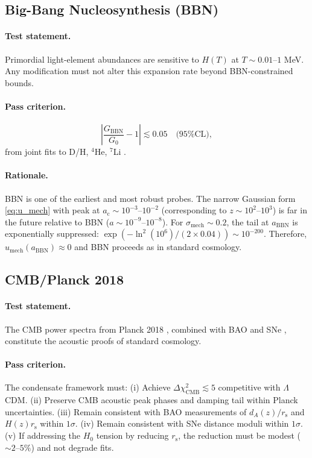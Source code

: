 \documentclass[11pt,a4paper]{article}
\newcommand{\ac}{a_{\mathrm{c}}}
\newcommand{\rs}{r_{\mathrm{s}}}
\newcommand{\sigmamech}{\sigma_{\mathrm{mech}}}
\newcommand{\umech}{u_{\mathrm{mech}}}
\theoremstyle{definition}
\begin{document}
\subsection{Big-Bang Nucleosynthesis (BBN)}
\label{sec:BBN}

\paragraph{Test statement.}
Primordial light-element abundances are sensitive to $H(T)$ at $T \sim 0.01$--$1$ MeV. Any modification must not alter this expansion rate beyond BBN-constrained bounds.

\paragraph{Pass criterion.}
\begin{equation}
\label{eq:BBN_G_bound}
\left| \frac{G_{\mathrm{BBN}}}{G_0} - 1 \right| \lesssim 0.05 \quad \text{(95\% CL)},
\end{equation}
from joint fits to D/H, $^4$He, $^7$Li \cite{BBN_Gbounds,PDG_BBN,Cooke_D2014,AdesOlivares_He2020}.

\paragraph{Rationale.}
BBN is one of the earliest and most robust probes. The narrow Gaussian form \eqref{eq:u_mech} with peak at $\ac \sim 10^{-3}$--$10^{-2}$ (corresponding to $z \sim 10^2$--$10^3$) is far in the future relative to BBN ($a \sim 10^{-9}$--$10^{-8}$). For $\sigmamech \sim 0.2$, the tail at $a_{\mathrm{BBN}}$ is exponentially suppressed: $\exp(-\ln^2(10^6)/(2 \times 0.04)) \sim 10^{-200}$. Therefore, $\umech(a_{\mathrm{BBN}}) \approx 0$ and BBN proceeds as in standard cosmology.

\subsection{CMB/Planck 2018}
\label{sec:CMB_Planck}

\paragraph{Test statement.}
The CMB power spectra from Planck 2018 \cite{Planck2018}, combined with BAO \cite{BOSS_BAO,eBOSS_BAO,DESI2024} and SNe \cite{Pantheon,PantheonPlus}, constitute the acoustic proofs of standard cosmology.

\paragraph{Pass criterion.}
The condensate framework must: (i) Achieve $\Delta\chi^2_{\mathrm{CMB}} \lesssim 5$ competitive with $\Lambda$CDM. (ii) Preserve CMB acoustic peak phases and damping tail within Planck uncertainties. (iii) Remain consistent with BAO measurements of $d_A(z)/\rs$ and $H(z) \rs$ within $1\sigma$. (iv) Remain consistent with SNe distance moduli within $1\sigma$. (v) If addressing the $H_0$ tension by reducing $\rs$, the reduction must be modest ($\sim 2$--$5\%$) and not degrade fits.
\end{document}
